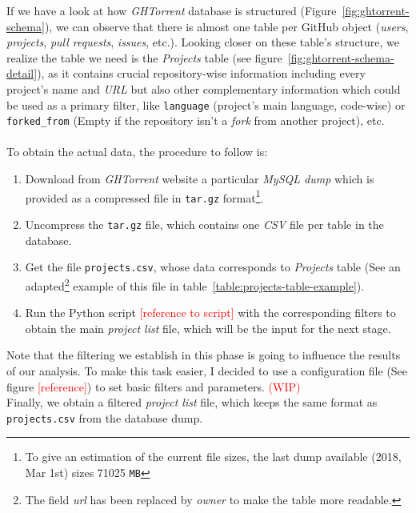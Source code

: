 \documentclass[a4paper, 12pt]{book}
\begin{document}
If we have a look at how \emph{GHTorrent} database is structured (Figure~\ref{fig:ghtorrent-schema}), we can observe that
there is almost one table per GitHub object (\textit{users}, \textit{projects}, \textit{pull requests}, \textit{issues}, etc.).
Looking closer on these table's structure, we realize the table we need is the \emph{Projects} table
(see figure~\ref{fig:ghtorrent-schema-detail}), as it contains crucial repository-wise information including every project's name
and \textit{URL} but also other complementary information which could be used as a primary filter, like \texttt{language} (project's main language,
code-wise) or \texttt{forked\_from} (Empty if the repository isn't a \textit{fork} from another project), etc.\\\\
To obtain the actual data, the procedure to follow is:
\begin{enumerate}
  \item Download from \emph{GHTorrent} website a particular \emph{MySQL dump} which is provided as a compressed file in \texttt{tar.gz}
        format\footnote{To give an estimation of the current file sizes, the last dump available (2018, Mar 1st) sizes 71025 \texttt{MB}}.
  \item Uncompress the \texttt{tar.gz} file, which contains one \emph{CSV} file per table in the database.
  \item Get the file \texttt{projects.csv}, whose data corresponds to \emph{Projects} table (See an adapted\footnote{The field \emph{url} has been replaced by \emph{owner} to make the table more readable.}
  example of this file in table~\ref{table:projects-table-example}).
  \item Run the Python script \textcolor{red}{[reference to script]} with the corresponding filters to obtain the main
        \emph{project list} file, which will be the input for the next stage.
\end{enumerate}
Note that the filtering we establish in this phase is going to influence the results of our analysis. To make this task easier,
I decided to use a configuration file (See figure \textcolor{red}{[reference]}) to set basic filters and parameters. \textcolor{red}{(WIP)}\\
Finally, we obtain a filtered \emph{project list} file, which keeps the same format as \texttt{projects.csv} from the database dump.
\end{document}

